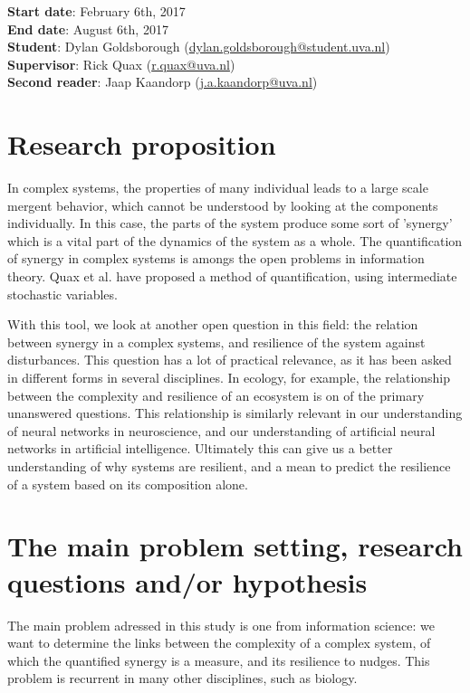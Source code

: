 \documentclass[11pt]{article}
\begin{document}
\noindent
\textbf{Start date}: February 6th, 2017\\
\textbf{End date}: August 6th, 2017\\
\textbf{Student}: Dylan Goldsborough (\url{dylan.goldsborough@student.uva.nl})\\
\textbf{Supervisor}: Rick Quax (\url{r.quax@uva.nl})\\
\textbf{Second reader}: Jaap Kaandorp (\url{j.a.kaandorp@uva.nl})\\

\section{Research proposition}

In complex systems, the properties of many individual leads to a large scale mergent behavior, which cannot be understood by looking at the components individually.
In this case, the parts of the system produce some sort of 'synergy' which is a vital part of the dynamics of the system as a whole.
The quantification of synergy in complex systems is amongs the open problems in information theory. 
Quax et al. have proposed a method of quantification, using intermediate stochastic variables.

With this tool, we look at another open question in this field: the relation between synergy in a complex systems, and resilience of the system against disturbances. 
This question has a lot of practical relevance, as it has been asked in different forms in several disciplines. 
In ecology, for example, the relationship between the complexity and resilience of an ecosystem is on of the primary unanswered questions.
This relationship is similarly relevant in our understanding of neural networks in neuroscience, and our understanding of artificial neural networks in artificial intelligence.
Ultimately this can give us a better understanding of why systems are resilient, and a mean to predict the resilience of a system based on its composition alone.

\section{The main problem setting, research questions and/or hypothesis}

The main problem adressed in this study is one from information science: we want to determine the links between the complexity of a complex system, of which the quantified synergy is a measure, and its resilience to nudges. 
This problem is recurrent in many other disciplines, such as biology.
\end{document}
